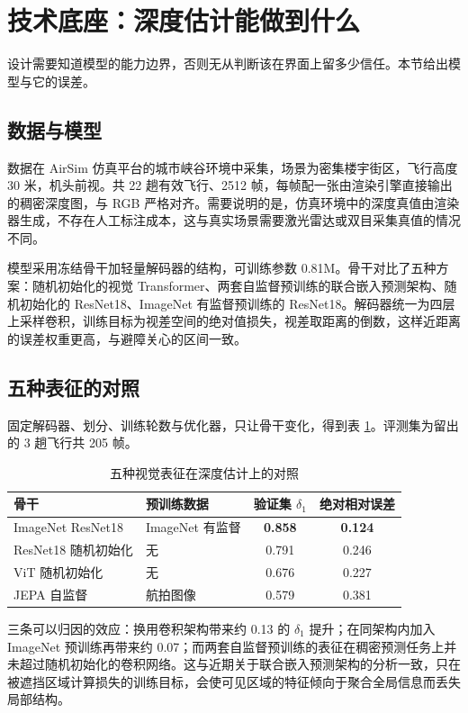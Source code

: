 \documentclass[12pt,a4paper]{ctexart}
\begin{document}
\section{技术底座：深度估计能做到什么}

设计需要知道模型的能力边界，否则无从判断该在界面上留多少信任。本节给出模型与它的误差。

\subsection{数据与模型}

数据在 AirSim 仿真平台的城市峡谷环境中采集，场景为密集楼宇街区，飞行高度 30 米，机头前视。共 22 趟有效飞行、2512 帧，每帧配一张由渲染引擎直接输出的稠密深度图，与 RGB 严格对齐。需要说明的是，仿真环境中的深度真值由渲染器生成，不存在人工标注成本，这与真实场景需要激光雷达或双目采集真值的情况不同。

模型采用冻结骨干加轻量解码器的结构，可训练参数 0.81M。骨干对比了五种方案：随机初始化的视觉 Transformer、两套自监督预训练的联合嵌入预测架构、随机初始化的 ResNet18、ImageNet 有监督预训练的 ResNet18。解码器统一为四层上采样卷积，训练目标为视差空间的绝对值损失，视差取距离的倒数，这样近距离的误差权重更高，与避障关心的区间一致。

\subsection{五种表征的对照}

固定解码器、划分、训练轮数与优化器，只让骨干变化，得到表 \ref{tab:backbone}。评测集为留出的 3 趟飞行共 205 帧。

\begin{table}[htbp]
\centering
\caption{五种视觉表征在深度估计上的对照}
\label{tab:backbone}
\begin{tabular}{llcc}
\toprule
骨干 & 预训练数据 & 验证集 $\delta_1$ & 绝对相对误差 \\
\midrule
ImageNet ResNet18 & ImageNet 有监督 & \textbf{0.858} & \textbf{0.124} \\
ResNet18 随机初始化 & 无 & 0.791 & 0.246 \\
ViT 随机初始化 & 无 & 0.676 & 0.227 \\
JEPA 自监督 & 航拍图像 & 0.579 & 0.381 \\
\bottomrule
\end{tabular}
\end{table}

三条可以归因的效应：换用卷积架构带来约 0.13 的 $\delta_1$ 提升；在同架构内加入 ImageNet 预训练再带来约 0.07；而两套自监督预训练的表征在稠密预测任务上并未超过随机初始化的卷积网络。这与近期关于联合嵌入预测架构的分析一致，只在被遮挡区域计算损失的训练目标，会使可见区域的特征倾向于聚合全局信息而丢失局部结构。
\end{document}
